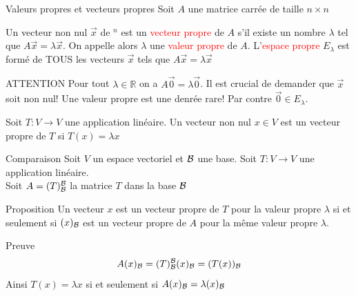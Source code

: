 \begin{parag}{Valeurs propres et vecteurs propres}
Soit $A$ une matrice carrée de taille $n \times n$
    \begin{definition}
        Un vecteur non nul $\vec{x}$ de \R$^n$ est un \textcolor{red}{vecteur propre} de $A$ s'il existe un nombre $\lambda$ tel que $A\vec{x} = \lambda \vec{x}$. On appelle alors $\lambda$ une \textcolor{red}{valeur propre} de $A$. L'\textcolor{red}{espace propre} $E_\lambda$ est formé de TOUS les vecteurs $\vec{x}$ tels que $A\vec{x} = \lambda\vec{x}$
    \end{definition}
    \begin{subparag}{ATTENTION}
        Pour tout $\lambda \in \mathbb{R}$ on a $A\vec{0} = \lambda \vec{0}$. Il est crucial de demander que $\vec{x}$ soit non nul! Une valeur propre est une denrée rare! Par contre $\vec{0} \in E_\lambda$.
    \end{subparag}

    \begin{definition}
        Soit $T : V \to V$ une application linéaire. Un vecteur non nul $x \in V$ est un vecteur propre de $T$ si $T(x) = \lambda x$
    \end{definition}

    \begin{subparag}{Comparaison}
        Soit $V$ un espace vectoriel et $\mathcal{B}$ une base. Soit $T: V \to V$ une application linéaire.
        \\
        Soit $A = (T)_{\mathcal{B}}^{\mathcal{B}}$ la matrice $T$ dans la base $\mathcal{B}$

    \end{subparag}


    \begin{subparag}{Proposition}
        Un vecteur $x$ est un vecteur propre de $T$ pour la valeur propre $\lambda$ si et seulement si $(x)_{\mathcal{B}}$ est un vecteur propre de $A$ pour la même valeur propre $\lambda$.
        \end{subparag}
    \begin{subparag}{Preuve}
        \[A(x)_{\mathcal{B}} = (T)_{\mathcal{B}}^{\mathcal{B}}(x)_{\mathcal{B}} = (T(x))_{\mathcal{B}}\]
        Ainsi $T(x) = \lambda x$ si et seulement si $A(x)_{\mathcal{B}} = \lambda(x)_{\mathcal{B}}$
    \end{subparag}


\end{parag}
